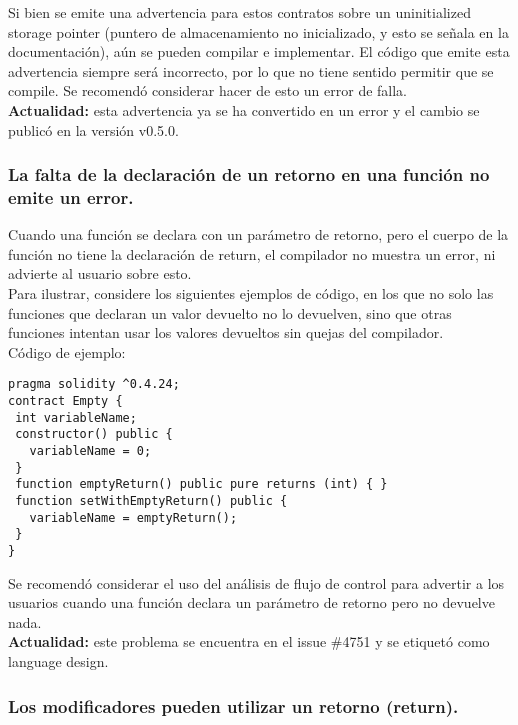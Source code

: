 Si bien se emite una advertencia para estos contratos sobre un uninitialized storage pointer (puntero de almacenamiento no inicializado, y esto se señala en la documentación), aún se pueden compilar e implementar. El código que emite esta advertencia siempre será incorrecto, por lo que no tiene sentido permitir que se compile. Se recomendó considerar hacer de esto un error de falla.\\

\textbf{Actualidad:} esta advertencia ya se ha convertido en un error y el cambio se publicó en la versión v0.5.0.

\subsubsection{La falta de la declaración de un retorno en una función no emite un error.}

Cuando una función se declara con un parámetro de retorno, pero el cuerpo de la función no tiene la declaración de return, el compilador no muestra un error, ni advierte al usuario sobre esto.\\

Para ilustrar, considere los siguientes ejemplos de código, en los que no solo las funciones que declaran un valor devuelto no lo devuelven, sino que otras funciones intentan usar los valores devueltos sin quejas del compilador.\\

Código de ejemplo:
\begin{lstlisting}[language=Solidity]
pragma solidity ^0.4.24;
contract Empty {
 int variableName;
 constructor() public {
   variableName = 0;
 }
 function emptyReturn() public pure returns (int) { }
 function setWithEmptyReturn() public {
   variableName = emptyReturn();
 }
}
\end{lstlisting}

Se recomendó considerar el uso del análisis de flujo de control para advertir a los usuarios cuando una función declara un parámetro de retorno pero no devuelve nada.\\

\textbf{Actualidad:} este problema se encuentra en el issue \#4751 y se etiquetó como language design.

\subsubsection{Los modificadores pueden utilizar un retorno (return).}

